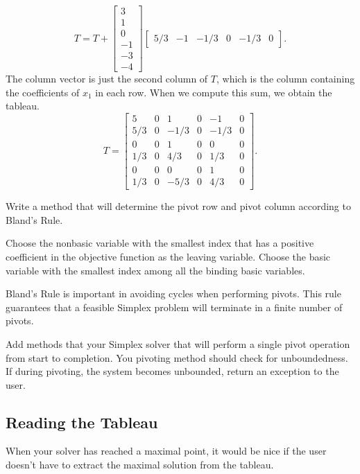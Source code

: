 \[
T = T + \begin{bmatrix}3 \\ 1 \\ 0 \\ -1 \\ -3 \\ -4\end{bmatrix}\begin{bmatrix} 5/3 & -1 & -1/3 & 0 & -1/3 & 0\end{bmatrix}.
\]
The column vector is just the second column of $T$, which is the column containing the coefficients of $x_1$ in each row.
When we compute this sum, we obtain the tableau.
\[
T = \begin{bmatrix}
        5 &  0 & 1 & 0 & -1 & 0 \\
        5/3 & 0 &-1/3 & 0 &-1/3 & 0 \\
        0 & 0 & 1 & 0 & 0 & 0 \\
        1/3 & 0 & 4/3 & 0 & 1/3 & 0 \\
        0 & 0 & 0 & 0 & 1 & 0 \\
        1/3 & 0 & -5/3 & 0 & 4/3 & 0
\end{bmatrix}.
\]

\begin{problem}
Write a method that will determine the pivot row and pivot column according to Bland's Rule.
\begin{definition}
Choose the nonbasic variable with the smallest index that has a positive coefficient in the objective function
as the leaving variable.  Choose the basic variable with the smallest index among all the binding basic variables.
\end{definition}

Bland's Rule is important in avoiding cycles when performing pivots.
This rule guarantees that a feasible Simplex problem will terminate in a finite number of pivots.
\label{prob:blands}
\end{problem}

\begin{problem}
Add methods that your Simplex solver that will perform a single pivot operation from start to completion.
You pivoting method should check for unboundedness.  
If during pivoting, the system becomes unbounded, return an exception to the user.
\end{problem}

\subsection{Reading the Tableau}
When your solver has reached a maximal point, it would be nice if the user doesn't have to extract the maximal solution from the tableau.

